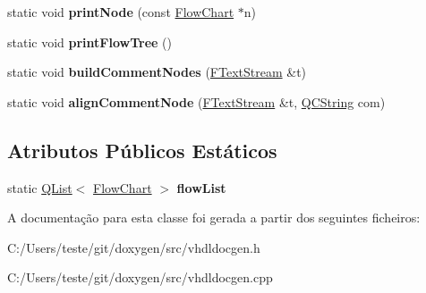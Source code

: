\begin{DoxyCompactItemize}
\item 
\hypertarget{class_flow_chart_af6d04df492d01f0496344aeb4be13edb}{static void {\bfseries print\-Node} (const \hyperlink{class_flow_chart}{Flow\-Chart} $\ast$n)}\label{class_flow_chart_af6d04df492d01f0496344aeb4be13edb}

\item 
\hypertarget{class_flow_chart_a1960f2d8ec6e4ed5d727921d93f6aa9b}{static void {\bfseries print\-Flow\-Tree} ()}\label{class_flow_chart_a1960f2d8ec6e4ed5d727921d93f6aa9b}

\item 
\hypertarget{class_flow_chart_a4fcec195075c5ed58a1b47272c2eb9d7}{static void {\bfseries build\-Comment\-Nodes} (\hyperlink{class_f_text_stream}{F\-Text\-Stream} \&t)}\label{class_flow_chart_a4fcec195075c5ed58a1b47272c2eb9d7}

\item 
\hypertarget{class_flow_chart_a46d54f53f2b4e728ddfb96e55f983979}{static void {\bfseries align\-Comment\-Node} (\hyperlink{class_f_text_stream}{F\-Text\-Stream} \&t, \hyperlink{class_q_c_string}{Q\-C\-String} com)}\label{class_flow_chart_a46d54f53f2b4e728ddfb96e55f983979}

\end{DoxyCompactItemize}
\subsection*{Atributos Públicos Estáticos}
\begin{DoxyCompactItemize}
\item 
\hypertarget{class_flow_chart_aaaf66169c62322d1d58dc20291e1b2a2}{static \hyperlink{class_q_list}{Q\-List}$<$ \hyperlink{class_flow_chart}{Flow\-Chart} $>$ {\bfseries flow\-List}}\label{class_flow_chart_aaaf66169c62322d1d58dc20291e1b2a2}

\end{DoxyCompactItemize}


A documentação para esta classe foi gerada a partir dos seguintes ficheiros\-:\begin{DoxyCompactItemize}
\item 
C\-:/\-Users/teste/git/doxygen/src/vhdldocgen.\-h\item 
C\-:/\-Users/teste/git/doxygen/src/vhdldocgen.\-cpp\end{DoxyCompactItemize}
